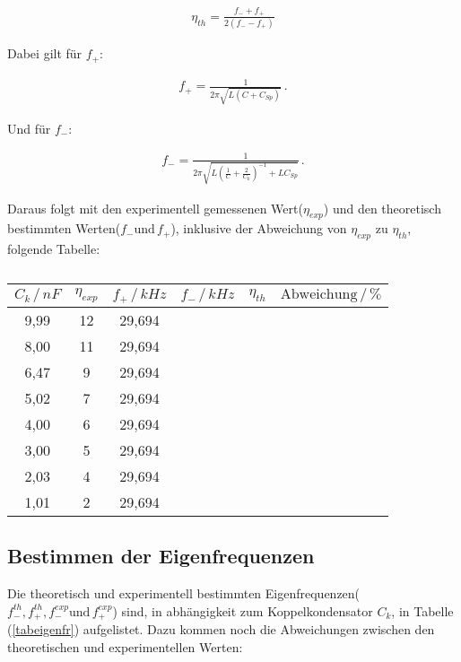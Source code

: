 \begin{align}
  \eta_{th} = \frac{f_- + f_+}{2(f_- - f_+)}
\end{align}

Dabei gilt für $f_+$:

\begin{align}
  f_+ = \frac{1}{2\pi\sqrt{L(C+C_{Sp})}}\,.
\end{align}

Und für $f_-$:

\begin{align}
  f_- = \frac{1}{2\pi\sqrt{L(\frac{1}{C}+\frac{2}{C_k})^{-1} + LC_{Sp}}}\,.
\end{align}

Daraus folgt mit den experimentell gemessenen Wert($\eta_{exp}$) und den theoretisch bestimmten Werten($f_-\text{und}\,f_+$), inklusive der
Abweichung von $\eta_{exp}$ zu $\eta_{th}$, folgende Tabelle:

\begin{table}[!h]
    \centering
    \caption{}
    \begin{tabular}{c c c c c c}
      \toprule
      $C_k\,/\,nF$ & $\eta_{exp}$ & $f_+\,/\,kHz$ & $f_-\,/\,kHz$ & $\eta_{th}$ & $\text{Abweichung}\,/\,\text{\%}$ \\
      \midrule
      9,99 & 12 & 29,694 &  & & \\
      8,00 & 11 & 29,694 & & & \\
      6,47 & 9  & 29,694 & & & \\
      5,02 & 7  & 29,694 & & & \\
      4,00 & 6  & 29,694 & & & \\
      3,00 & 5  & 29,694 & & & \\
      2,03 & 4  & 29,694 & & & \\
      1,01 & 2  & 29,694 & & & \\
      \bottomrule
    \end{tabular}
\end{table}

\subsection{Bestimmen der Eigenfrequenzen}

Die theoretisch und experimentell bestimmten Eigenfrequenzen($f_-^{th}, f_+^{th}, f_-^{exp} \text{und}\,f_+^{exp}$) sind, in abhängigkeit zum
Koppelkondensator $C_k$, in Tabelle (\ref{tabeigenfr}) aufgelistet. Dazu kommen noch die Abweichungen zwischen den theoretischen und experimentellen
Werten:

